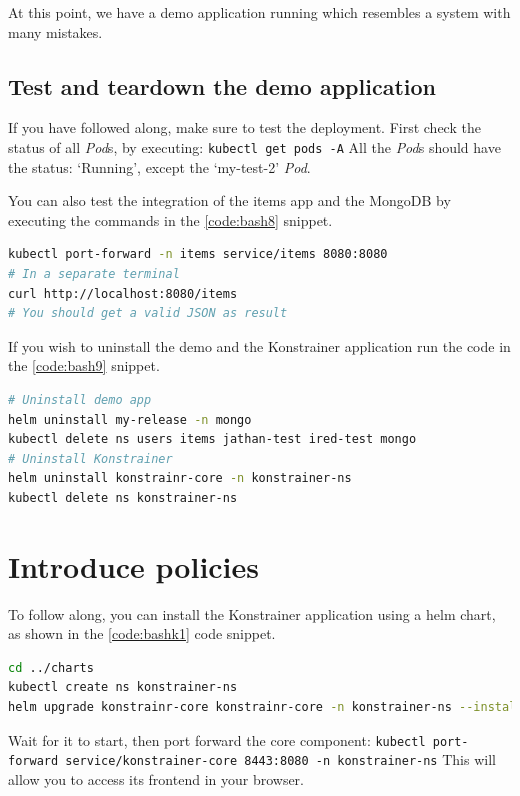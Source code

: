 At this point, we have a demo application running which resembles a system with many mistakes.

\subsection{Test and teardown the demo application}

If you have followed along, make sure to test the deployment. First check the status of all \emph{Pod}s, by executing: \lstinline|kubectl get pods -A| All the \emph{Pod}s should have the status: `Running', except the `my-test-2' \emph{Pod}.

You can also test the integration of the items app and the MongoDB by executing the commands in the \ref{code:bash8} snippet.

\begin{lstlisting}[caption={Test the integration of the items app and MongoDB},language=bash,label=code:bash8]
kubectl port-forward -n items service/items 8080:8080
# In a separate terminal
curl http://localhost:8080/items
# You should get a valid JSON as result
\end{lstlisting}

If you wish to uninstall the demo and the Konstrainer application run the code in the \ref{code:bash9} snippet.

\begin{lstlisting}[caption={Teardown},language=bash,label=code:bash9]
# Uninstall demo app
helm uninstall my-release -n mongo
kubectl delete ns users items jathan-test ired-test mongo
# Uninstall Konstrainer
helm uninstall konstrainr-core -n konstrainer-ns
kubectl delete ns konstrainer-ns
\end{lstlisting}

\section{Introduce policies}

To follow along, you can install the Konstrainer application using a helm chart, as shown in the \ref{code:bashk1} code snippet.

\begin{lstlisting}[caption={Install Konstrainer},language=bash,label=code:bashk1]
cd ../charts
kubectl create ns konstrainer-ns
helm upgrade konstrainr-core konstrainr-core -n konstrainer-ns --install
\end{lstlisting}

Wait for it to start, then port forward the core component: \lstinline|kubectl port-forward service/konstrainer-core 8443:8080 -n konstrainer-ns|
This will allow you to access its frontend in your browser.

